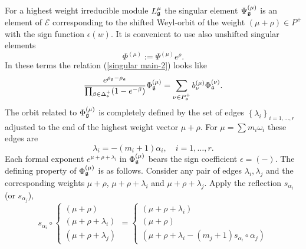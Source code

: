 For a highest weight irreducible module $L_{\mathfrak{g}}^{\mu }$ the singular
element $\Psi _{\mathfrak{g}}^{\left( \mu \right) }$ is an element of $\mathcal{E%
}$ corresponding to the shifted Weyl-orbit of the weight $\left( \mu +\rho
\right) \in P^{+}$ with the sign function $\epsilon \left( w\right) $. It is
convenient to use also unshifted singular elements
\begin{equation}
\Phi ^{\left( \mu \right) }:=\Psi ^{\left( \mu \right) }e^{\rho }.
\label{definition Phi}
\end{equation}
In these terms the relation (\ref{singular main-2}) looks like
\begin{equation}
\frac{e^{\rho _{\gf}-\rho _{\af}}}{\prod_{\beta \in \Delta _{\frak{%
s}}^{+}}(1-e^{-\beta })}\Phi _{\gf}^{\left( \mu \right) }=\sum_{\nu \in
P_{\af}^{+}}b_{\nu }^{(\mu )}\Phi _{\af}^{\left( \nu \right) }.
\label{singular main-3}
\end{equation}
The orbit related to $\Phi _{\mathfrak{g}}^{\left( \mu \right) }$ is completely
defined by the set of edges $\left\{ \lambda _{i}\right\} _{i=1,\dots ,r}$
adjusted to the end of the highest weight vector $\mu +\rho $. For $\mu
=\sum m_{i}\omega _{i}$ these edges are
\begin{equation}
\lambda _{i}=-\left( m_{i}+1\right) \alpha _{i},\quad i=1,\dots ,r.
\label{edge}
\end{equation}
Each formal exponent $e^{\mu +\rho +\lambda _{i}}$ in $\Phi _{\gf%
}^{\left( \mu \right) }$ bears the sign coefficient $\epsilon =(-)$. The
defining property of $\Phi _{\mathfrak{g}}^{\left( \mu \right) }$ is as follows.
Consider any pair of edges $\lambda _{i},\lambda _{j}$ and the corresponding
weights $\mu +\rho $, $\mu +\rho +\lambda _{i}$ and $\mu +\rho +\lambda _{j}$. 
Apply the reflection $s_{\alpha _{i}}$ (or $s_{\alpha _{j}}$),
\begin{equation}
s_{\alpha _{i}}\circ \left\{
\begin{array}{l}
\left( \mu +\rho \right)  \\
\left( \mu +\rho +\lambda _{i}\right)  \\
\left( \mu +\rho +\lambda _{j}\right)
\end{array}
\right. =\left\{
\begin{array}{l}
\left( \mu +\rho +\lambda _{i}\right)  \\
\left( \mu +\rho \right)  \\
\left( \mu +\rho +\lambda _{i}-(m_{j}+1)s_{\alpha _{i}}\circ \alpha
_{j}\right)
\end{array}
\right.   \label{reflected triple}
\end{equation}

